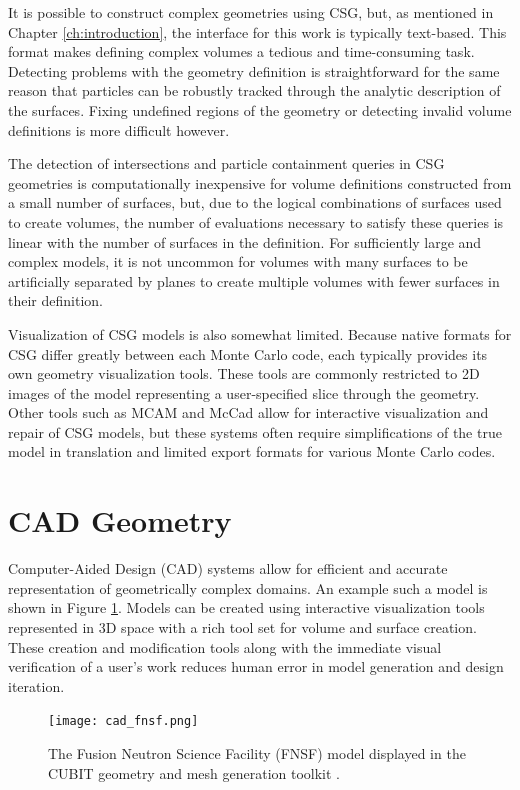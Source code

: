 It is possible to construct complex geometries using CSG, but, as mentioned in
Chapter \ref{ch:introduction}, the interface for this work is typically
text-based. This format makes defining complex volumes a tedious and
time-consuming task. Detecting problems with the geometry definition is
straightforward for the same reason that particles can be robustly tracked
through the analytic description of the surfaces. Fixing
undefined regions of the geometry or detecting invalid volume definitions is
more difficult however.

The detection of intersections and particle containment queries in CSG
geometries is computationally inexpensive for volume definitions constructed
from a small number of surfaces, but, due to the logical combinations of
surfaces used to create volumes, the number of evaluations necessary to satisfy
these queries is linear with the number of surfaces in the definition. For
sufficiently large and complex models, it is not uncommon for volumes with many
surfaces to be artificially separated by planes to create multiple volumes with
fewer surfaces in their definition.

Visualization of CSG models is also somewhat limited. Because native formats for
CSG differ greatly between each Monte Carlo code, each typically provides its
own geometry visualization tools. These tools are commonly restricted to 2D
images of the model representing a user-specified slice through the
geometry. Other tools such as MCAM \cite{Liu_2005} and McCad
\cite{Tsigetamirat_2008} allow for interactive visualization and repair of CSG
models, but these systems often require simplifications of the true model in
translation and limited export formats for various Monte Carlo codes.

\section{CAD Geometry}

Computer-Aided Design (CAD) systems allow for efficient and accurate
representation of geometrically complex domains. An example such a model is
shown in Figure \ref{fig:cad_fnsf}. Models can be created using interactive
visualization tools represented in 3D space with a rich tool set for volume and
surface creation. These creation and modification tools along with the immediate
visual verification of a user's work reduces human error in model generation and
design iteration.

\begin{figure}[H]
  \centering
  \texttt{[image: cad\_fnsf.png]}
  \caption[CAD image of the FNSF facility.]{The Fusion Neutron Science Facility (FNSF)\cite{Kessel_2017} model
    displayed in the CUBIT geometry and mesh generation toolkit \cite{Blacker_1994}.}
  \label{fig:cad_fnsf}
\end{figure}

